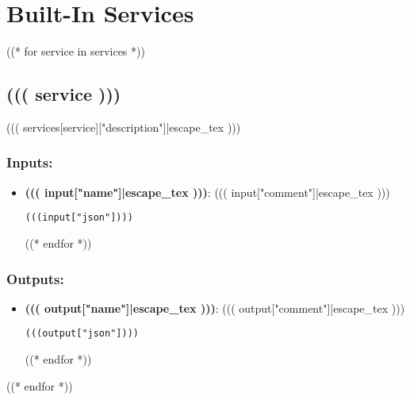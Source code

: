 \section{Built-In Services}
\label{ch:builtinservices}

((* for service in services *))
\subsection{((( service )))}
((( services[service]["description"]|escape_tex )))
\subsubsection*{Inputs:}
\begin{itemize}
  ((* for input in services[service]["inputs"] *))
  \item \textbf{((( input["name"]|escape_tex )))}: ((( input["comment"]|escape_tex )))
\begin{lstlisting}
(((input["json"])))
\end{lstlisting}
  ((* endfor *))
\end{itemize}

\subsubsection*{Outputs:}
\begin{itemize}
  ((* for output in services[service]["outputs"] *))
  \item \textbf{((( output["name"]|escape_tex )))}: ((( output["comment"]|escape_tex )))
\begin{lstlisting}
(((output["json"])))
\end{lstlisting}
  ((* endfor *))
\end{itemize}

((* endfor *))
